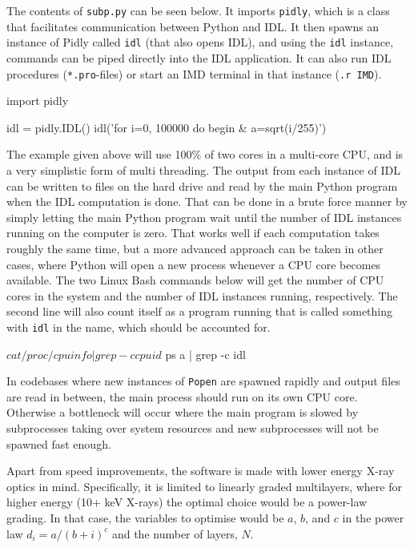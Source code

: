 The contents of \verb|subp.py| can be seen below. It imports \verb|pidly|, which is a class that facilitates communication between Python and IDL. It then spawns an instance of Pidly called \verb|idl| (that also opens IDL), and using the \verb|idl| instance, commands can be piped directly into the IDL application. It can also run IDL procedures (\verb|*.pro|-files) or start an IMD terminal in that instance (\verb|.r IMD|).

\begin{verbcode}
import pidly

idl = pidly.IDL()
idl('for i=0, 100000 do begin & a=sqrt(i/255)')
\end{verbcode}

The example given above will use 100\% of two cores in a multi-core CPU, and is a very simplistic form of multi threading. The output from each instance of IDL can be written to files on the hard drive and read by the main Python program when the IDL computation is done. That can be done in a brute force manner by simply letting the main Python program wait until the number of IDL instances running on the computer is zero. That works well if each computation takes roughly the same time, but a more advanced approach can be taken in other cases, where Python will open a new process whenever a CPU core becomes available. The two Linux Bash commands below will get the number of CPU cores in the system and the number of IDL instances running, respectively. The second line will also count itself as a program running that is called something with \verb|idl| in the name, which should be accounted for.

\begin{verbcode}
  $ cat /proc/cpuinfo | grep -c cpuid

  $ ps a | grep -c idl
\end{verbcode}

In codebases where new instances of \verb|Popen| are spawned rapidly and output files are read in between, the main process should run on its own CPU core. Otherwise a bottleneck will occur where the main program is slowed by subprocesses taking over system resources and new subprocesses will not be spawned fast enough.

Apart from speed improvements, the software is made with lower energy X-ray optics in mind. Specifically, it is limited to linearly graded multilayers, where for higher energy (10+ keV X-rays) the optimal choice would be a power-law grading. In that case, the variables to optimise would be $a$, $b$, and $c$ in the power law $d_i = a/(b+i)^c$ and the number of layers, $N$.

